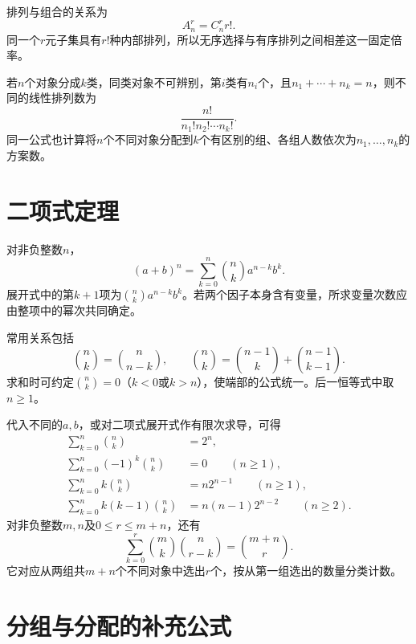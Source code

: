 排列与组合的关系为
\begin{equation*}
 A_n^r=C_n^r r!.
\end{equation*}
同一个\(r\)元子集具有\(r!\)种内部排列，所以无序选择与有序排列之间相差这一固定倍率。

若\(n\)个对象分成\(k\)类，同类对象不可辨别，第\(i\)类有\(n_i\)个，且\(n_1+\cdots+n_k=n\)，则不同的线性排列数为
\begin{equation*}
 \frac{n!}{n_1!n_2!\cdots n_k!}.
\end{equation*}
同一公式也计算将\(n\)个不同对象分配到\(k\)个有区别的组、各组人数依次为\(n_1,\ldots,n_k\)的方案数。

\section{二项式定理}

对非负整数\(n\)，
\begin{equation*}
 (a+b)^n=\sum_{k=0}^n\binom nk a^{n-k}b^k.
\end{equation*}
展开式中的第\(k+1\)项为\(\binom nk a^{n-k}b^k\)。若两个因子本身含有变量，所求变量次数应由整项中的幂次共同确定。

常用关系包括
\begin{equation*}
 \binom nk=\binom n{n-k},\qquad
 \binom nk=\binom{n-1}{k}+\binom{n-1}{k-1}.
\end{equation*}
求和时可约定\(\binom nk=0\)（\(k<0\)或\(k>n\)），使端部的公式统一。后一恒等式中取\(n\ge1\)。

代入不同的\(a,b\)，或对二项式展开式作有限次求导，可得
\begin{equation*}
 \begin{aligned}
 \sum_{k=0}^n\binom nk&=2^n,\\
 \sum_{k=0}^n(-1)^k\binom nk&=0\qquad(n\ge1),\\
 \sum_{k=0}^n k\binom nk&=n2^{n-1}\qquad(n\ge1),\\
 \sum_{k=0}^n k(k-1)\binom nk&=n(n-1)2^{n-2}\qquad(n\ge2).
 \end{aligned}
\end{equation*}
对非负整数\(m,n\)及\(0\le r\le m+n\)，还有
\begin{equation*}
 \sum_{k=0}^r\binom mk\binom n{r-k}=\binom{m+n}r.
\end{equation*}
它对应从两组共\(m+n\)个不同对象中选出\(r\)个，按从第一组选出的数量分类计数。

\section{分组与分配的补充公式}

